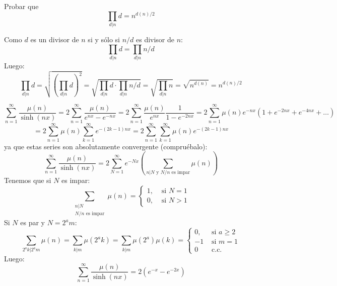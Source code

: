 \documentclass[twoside]{article}
\begin{document}
\begin{ejercicio}{13}
\newpage

\begin{ejercicio}{15}
Probar que
\[ \prod_{d|n} d = n^{d(n)/2} \]
\end{ejercicio}

\begin{sol}
Como $d$ es un divisor de $n$ si y sólo si $n/d$ es divisor de $n$:
\[ \prod_{d|n} d = \prod_{d|n} n/d \]
Luego:
\[ \prod_{d|n} d = \sqrt{\left(\prod_{d|n} d\right)^2} = \sqrt{\prod_{d|n} d \cdot \prod_{d|n} n/d} = \sqrt{\prod_{d|n} n} = \sqrt{n^{d(n)}} = n^{d(n)/2} \]
\end{sol}
\end{ejercicio}

\[ \sum_{n=1}^{∞} \frac{μ(n)}{\sinh (nx)} = 2 \sum_{n=1}^{∞} \frac{μ(n)}{e^{nx} - e^{-nx}} = 2 \sum_{n=1}^{∞} \frac{μ(n)}{e^{nx}} \frac{1}{1-e^{-2nx}} = 2 \sum_{n=1}^{∞} μ(n) e^{-nx}(1+e^{-2nx}+e^{-4nx}+\dots) \]
\[ = 2 \sum_{n=1}^{∞} μ(n) \sum_{k=1}^{∞} e^{-(2k-1)nx} = 2 \sum_{n=1}^{∞} \sum_{k=1}^{∞} μ(n) e^{-(2k-1)nx}\]
ya que estas series son absolutamente convergente (compruébalo):
\[ \sum_{n=1}^{∞} \frac{μ(n)}{\sinh (nx)} = 2 \sum_{N=1}^{∞} e^{-Nx} \left(\sum_{n|N \text{ y }N/n\text{ es impar}} μ(n) \right)\]
Tenemos que si $N$ es impar:
\[ \sum_{\substack{n|N \\ N/n\text{ es impar}}} μ(n) = \begin{cases}
	1, &\text{ si }N = 1\\
	0, &\text{ si }N > 1
\end{cases}\]
Si $N$ es par y $N=2^am$:
\[ \sum_{2^ak|2^am} μ(n) = \sum_{k|m} μ(2^a k) = \sum_{k|m} μ(2^a) μ(k) = \begin{cases}
	0, &\text{ si }a ≥ 2\\
	-1 &\text{ si }m=1\\
	0 &\text{ c.c.}
\end{cases}\]
Luego:
\[ \sum_{n=1}^{∞} \frac{μ(n)}{\sinh (nx)} = 2(e^{-x}-e^{-2x})\]
\end{document}
